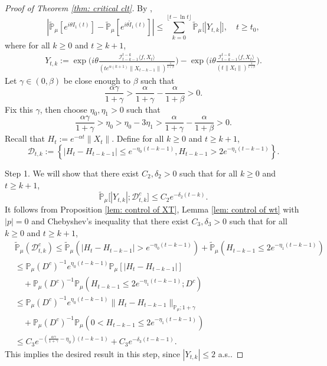 \documentclass[12pt,a4paper]{amsart}
\theoremstyle{plain}
\theoremstyle{definition}
\numberwithin{equation}{section}
\begin{document}
\begin{proof}[Proof of Theorem \ref{thm: critical clt}]
  By \cite[Lemma 3.4.3]{Durrett2010Probability},
  \begin{equation}
    \label{ineq: control of I1t}
    |\mathbb{\widetilde{P}}_{\mu}[e^{i\theta I_1(t)}] - \mathbb{\widetilde{P}}_{\mu} [e^{i\theta\widetilde{I}_1(t)}]|
    \leq \sum_{k=0}^{\lfloor t-\ln t \rfloor}\mathbb{\widetilde{P}}_{\mu}\big[|Y_{t,k}|\big],
    \quad t\geq t_0,
  \end{equation}
  where for all $k \geq 0$ and $t\geq k+1$,
  \begin{align}
    Y_{t,k}
    :=\exp\Big(i\theta\frac{\mathcal I_{t-k-1}^{t-k}\langle f ,X_t\rangle}{(t e^{\alpha(k+1)}\|X_{t-k-1}\|)^{\frac{1}{1+\beta}}}\Big)-\exp\Big(i\theta\frac{\mathcal I_{t-k-1}^{t-k}\langle f ,X_t\rangle}{(t\|X_t\|)^{\frac{1}{1+\beta}}}\Big).
  \end{align}
  Let $\gamma \in (0,\beta)$ be close enough to $\beta$ such that
  \[
    \frac{\alpha \gamma}{1+\gamma} > \frac{\alpha}{1+\gamma} - \frac{\alpha}{1+\beta} > 0.
  \]
  Fix this $\gamma$, then choose $\eta_0,\eta_1>0$ such that
  \[
    \frac{\alpha \gamma}{1+\gamma} >\eta_0 > \eta_0 - 3\eta_1 > \frac{\alpha}{1+\gamma} - \frac{\alpha}{1+\beta} > 0.
  \]
  Recall that $H_t := e^{-\alpha t}\|X_t\|$.
  Define for all $k \geq 0$ and $t\geq k+1$,
  \begin{equation}
    \label{def: Dtk}
    \mathcal{D}_{t,k}
    :=\left\{|H_t-H_{t-k-1}|\leq  e^{-\eta_0 (t-k-1)}, H_{t-k-1}> 2e^{-\eta_1(t-k-1)}\right\}.
  \end{equation}

  Step 1. We will show that there exist $C_2,\delta_2 >0$ such that for all $k \geq 0$ and $t\geq k+1$,
  \begin{equation}
    \label{thm121}
    \mathbb{\widetilde{P}}_{\mu}\big[|Y_{t,k}|;\mathcal{D}^c_{t,k}\big]
    \leq C_2 e^{-\delta_2 (t-k)}.
  \end{equation}
  It follows from Proposition \ref{lem: control of XT}, Lemma \ref{lem: control of wt} with $|p|=0$ and Chebyshev's inequality that there exist $C_3, \delta_3>0$ such that for all $k \geq 0$ and $t\geq k+1$,
  \begin{align}
    \label{eq: prob of Dtkc}
    & \mathbb{\widetilde{P}}_{\mu}(\mathcal{D}_{t,k}^c)
    \leq \mathbb{\widetilde{P}}_{\mu}(|H_t-H_{t-k-1}| > e^{-\eta_0 (t-k-1)})+\mathbb{\widetilde{P}}_{\mu}(H_{t-k-1}\leq 2e^{-\eta_1(t-k-1)}) \\
    & \leq \mathbb{P}_{\mu}(D^c)^{-1}e^{\eta_0(t-k-1)}\mathbb{P}_{\mu}[|H_t-H_{t-k-1}|] \\
    & \quad 
      + \mathbb{P}_{\mu}(D^c)^{-1} \mathbb P_\mu(H_{t-k-1}\leq 2e^{-\eta_1(t-k-1)}; D^c) \\
    & \leq \mathbb{P}_{\mu}(D^c)^{-1}  e^{\eta_0(t-k-1)}\|H_t - H_{t-k-1}\|_{\mathbb P_\mu; 1+\gamma} \\
    & \quad + \mathbb{P}_{\mu}(D^c)^{-1} \mathbb P_\mu(0<H_{t-k-1}\leq 2e^{-\eta_1(t-k-1)}) \\
    & \leq C_3 e^{-(\frac{\alpha \gamma}{1+\gamma} - \eta_0)(t-k-1)}+C_3 e^{-\delta_3(t-k-1)}.
  \end{align}
  This implies the desired result in this step, since $|Y_{t,k}| \leq 2$ a.s..
  

\end{proof}
\end{document}
